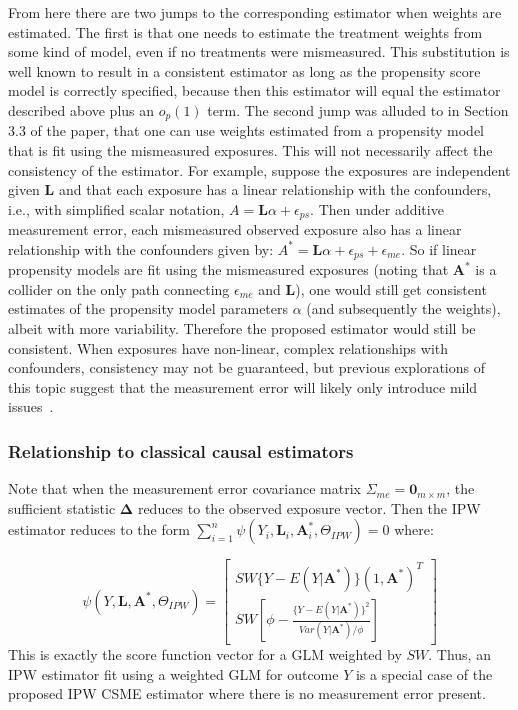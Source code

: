 \documentclass[12pt]{article}
\begin{document}
From here there are two jumps to the corresponding estimator when weights are estimated. The first is that one needs to estimate the treatment weights from some kind of model, even if no treatments were mismeasured. This substitution is well known to result in a consistent estimator as long as the propensity score model is correctly specified, because then this estimator will equal the estimator described above plus an $o_{p}(1)$ term. The second jump was alluded to in Section 3.3 of the paper, that one can use weights estimated from a propensity model that is fit using the mismeasured exposures. This will not necessarily affect the consistency of the estimator. For example, suppose the exposures are independent given $\bm{L}$ and that each exposure has a linear relationship with the confounders, i.e., with simplified scalar notation, $A = \bm{L} \alpha + \epsilon_{ps}$. Then under additive measurement error, each mismeasured observed exposure also has a linear relationship with the confounders given by: $A^{*} = \bm{L} \alpha + \epsilon_{ps} + \epsilon_{me}$. So if linear propensity models are fit using the mismeasured exposures (noting that $\bm{A}^{*}$ is a collider on the only path connecting $\epsilon_{me}$ and $\bm{L}$), one would still get consistent estimates of the propensity model parameters $\alpha$ (and subsequently the weights), albeit with more variability. Therefore the proposed estimator would still be consistent. When exposures have non-linear, complex relationships with confounders, consistency may not be guaranteed, but previous explorations of this topic suggest that the measurement error will likely only introduce mild issues~\citep{carroll2006}.

\subsubsection{Relationship to classical causal estimators}

Note that when the measurement error covariance matrix $\Sigma_{me} = \textbf{0}_{m \times m}$, the sufficient statistic $\bm{\Delta}$ reduces to the observed exposure vector. Then the IPW estimator reduces to the form $\sum_{i=1}^{n} \psi(Y_{i}, \bm{L}_{i}, \bm{A}^{*}_{i}, \Theta_{IPW}) = 0$ where:

\begin{equation*}
    \psi(Y, \bm{L}, \bm{A}^{*}, \Theta_{IPW}) =
    \begin{bmatrix}
       SW\{ Y - E(Y | \bm{A}^{*}) \} (1, \bm{A}^{*})^{T} \\
       SW \left [ \phi - \frac{ \{Y - E(Y | \bm{A}^{*}) \}^{2}}{Var(Y | \bm{A}^{*}) / \phi} \right ]
    \end{bmatrix}
\end{equation*}
This is exactly the score function vector for a GLM weighted by $SW$. Thus, an IPW estimator fit using a weighted GLM for outcome $Y$ is a special case of the proposed IPW CSME estimator where there is no measurement error present.
\end{document}
